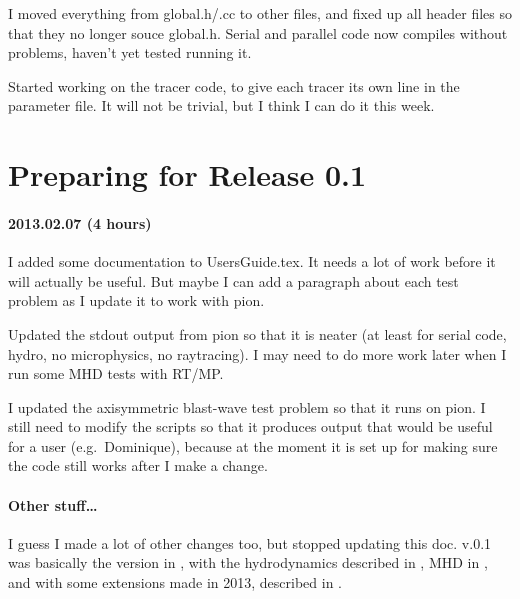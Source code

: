 \documentclass[a4paper,11pt]{article}
\begin{document}
I moved everything from global.h/.cc to other files, and fixed up all header files so that they no longer souce global.h.
Serial and parallel code now compiles without problems, haven't yet tested running it.

Started working on the tracer code, to give each tracer its own line in the parameter file.
It will not be trivial, but I think I can do it this week.


\section{Preparing for Release 0.1}
\paragraph{2013.02.07 (4 hours)}
I added some documentation to UsersGuide.tex.
It needs a lot of work before it will actually be useful.
But maybe I can add a paragraph about each test problem as I update it to work with pion.

Updated the stdout output from pion so that it is neater (at least for serial code, hydro, no microphysics, no raytracing).  I may need to do more work later when I run some MHD tests with RT/MP.

I updated the axisymmetric blast-wave test problem so that it runs on pion.
I still need to modify the scripts so that it produces output that would be useful for a user (e.g.\ Dominique), because at the moment it is set up for making sure the code still works after I make a change.

\paragraph{Other stuff\ldots}
I guess I made a lot of other changes too, but stopped updating this doc.
\pion{} v.0.1 was basically the version in \citet{Mac12}, with the hydrodynamics described in \citet{MacLim10}, MHD in \citet{MacLim11}, and with some extensions made in 2013, described in \citet{MacLanGva13}.





\end{document}
